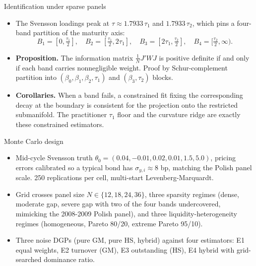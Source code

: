 \documentclass[aspectratio=169,11pt]{beamer}
\begin{document}
\begin{frame}{Identification under sparse panels}
  \begin{itemize}
    \item The Svensson loadings peak at $\tau \approx 1.7933\,\tau_1$ and
          $1.7933\,\tau_2$, which pins a four-band partition of the maturity
          axis:
          \[ B_1 = [0,\tfrac{\tau_1}{2}], \quad
             B_2 = [\tfrac{\tau_1}{2}, 2\tau_1], \quad
             B_3 = [2\tau_1, \tfrac{\tau_2}{2}], \quad
             B_4 = [\tfrac{\tau_2}{2}, \infty). \]
    \item \textbf{Proposition.} The information matrix $\tfrac1N J'WJ$ is
          positive definite if and only if each band carries nonnegligible
          weight. Proof by Schur-complement partition into
          $(\beta_0,\beta_1,\beta_2,\tau_1)$ and $(\beta_3,\tau_2)$ blocks.
    \item \textbf{Corollaries.} When a band fails, a constrained fit fixing
          the corresponding decay at the boundary is consistent for the
          projection onto the restricted submanifold. The practitioner
          $\tau_1$ floor and the curvature ridge are exactly these
          constrained estimators.
  \end{itemize}
\end{frame}

\begin{frame}{Monte Carlo design}
  \begin{itemize}
    \item Mid-cycle Svensson truth
          $\theta_0 = (0.04, -0.01, 0.02, 0.01, 1.5, 5.0)$, pricing errors
          calibrated so a typical bond has $\sigma_{y,i}\approx 8$ bp,
          matching the Polish panel scale. 250 replications per cell,
          multi-start Levenberg-Marquardt.
    \item Grid crosses panel size $N \in \{12, 18, 24, 36\}$, three sparsity
          regimes (dense, moderate gap, severe gap with two of the four bands
          undercovered, mimicking the 2008-2009 Polish panel), and three
          liquidity-heterogeneity regimes (homogeneous, Pareto 80/20,
          extreme Pareto 95/10).
    \item Three noise DGPs (pure GM, pure HS, hybrid) against four
          estimators: E1 equal weights, E2 turnover (GM), E3 outstanding
          (HS), E4 hybrid with grid-searched dominance ratio.
  \end{itemize}
\end{frame}
\end{document}
